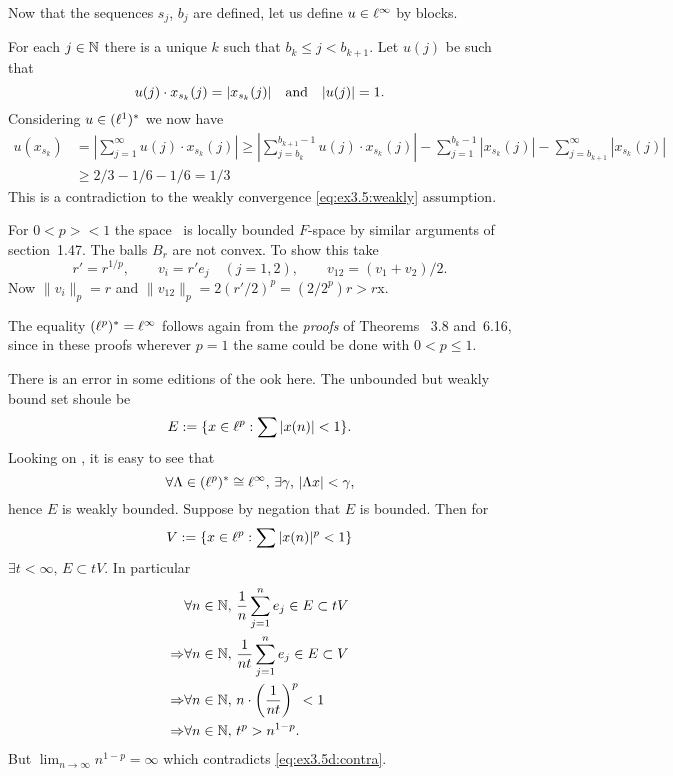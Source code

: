 \begin{enumerate}
\begin{itemize}
Now that the sequences
\(s_j\), \(b_j\) are defined, let us
define \(u\in\ell^\infty\) by blocks.

For each \(j\in \mathbb{N}\)
there is a unique $k$ such that \(b_k \leq j < b_{k+1}\).
Let \(u(j)\) be such that
\begin{equation*}
u(j)\cdot x_{s_k}(j) = |x_{s_k}(j)| \quad\textnormal{and}\quad |u(j)|=1.
\end{equation*}
Considering \(u\in(\ell^1)^*\) we now have
\begin{align*}
u(x_{s_k})
&= \left|\sum_{j=1}^\infty u(j) \cdot x_{s_k}(j)\right|
 \geq \left|\sum_{j=b_k}^{b_{k+1}-1} u(j) \cdot x_{s_k}(j)\right|
     - \sum_{j=1}^{b_k-1} |x_{s_k}(j)|
     - \sum_{j=b_{k+1}}^\infty |x_{s_k}(j)| \\
&\geq 2/3 - 1/6 - 1/6 = 1/3
\end{align*}
This is a contradiction to the
weakly convergence \eqref{eq:ex3.5:weakly} assumption.


For \(0<p><1\) the space \ellp\ is locally bounded $F$-space
by similar arguments of section~1.47.
The balls \(B_r\) are not convex. To show this take
\begin{equation*}
r' = r^{1/p}, \qquad v_i = r'e_j \quad (j=1,2), \qquad v_{12} = (v_1+v_2)/2.
\end{equation*}
Now \(\|v_i\|_p = r\) and \(\|v_{12}\|_p = 2(r'/2)^p = (2/2^p)r > r\)x.

The equality \((\ell^p)^* = \ell^\infty\) follows again from the
\emph{proofs} of Theorems \cite{RudinRCA87}~3.8 and~6.16, since in these
proofs wherever \(p=1\) the same could be done with \(0 < p \leq 1\).

There is an error in some editions of the ook here.
The unbounded but weakly bound set shoule be
\begin{equation*}
E := \{x\in\ell^p: \sum|x(n)|<1\}.
\end{equation*}
Looking on \ellone, it is easy to see that
\begin{equation*}
\forall \Lambda\in (\ell^p)^* \cong \ell^\infty,\,\exists \gamma,\,|\Lambda x|<\gamma,
\end{equation*}
hence $E$ is weakly bounded.
Suppose by negation that $E$ is bounded. Then for
\begin{equation*}
V := \{x\in\ell^p: \sum|x(n)|^p < 1\}
\end{equation*}
\(\exists t<\infty,\,E\subset tV\).
In particular
\begin{align}
            & \forall n\in\mathbb{N},\, \frac{1}{n}\sum_{j=1}^n e_j \in E \subset tV
 \notag \\
\Rightarrow & \forall n\in\mathbb{N},\, \frac{1}{nt}\sum_{j=1}^n e_j \in E \subset V
 \notag \\
\Rightarrow & \forall n\in\mathbb{N},\, n\cdot\left(\frac{1}{nt}\right)^p < 1
 \notag \\
\Rightarrow & \forall n\in\mathbb{N},\, t^p > n^{1-p}. \label{eq:ex3.5d:contra}
\end{align}
But \(\lim_{n\to\infty} n^{1-p} = \infty\)
which contradicts \eqref{eq:ex3.5d:contra}.


\end{itemize}
\end{enumerate}
